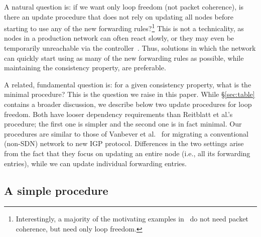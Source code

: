 A natural question is: if we want only loop freedom (not packet coherence), is there an update procedure that does not rely on updating all nodes before starting to use any of the new forwarding rules?\footnote{Interestingly, a majority of the motivating examples in~\cite{safeupdate} do not need packet coherence, but need only loop freedom.}  This is not a technicality, as nodes in a production network can often react slowly, or they may even be temporarily unreachable via the controller~\cite{b4}.  Thus, solutions in which the network can quickly start using as many of the new forwarding rules as possible, while maintaining the consistency property, are preferable.

A related, fundamental question is: for a given consistency property, what is the minimal procedure? This is the question we raise in this paper. While \S\ref{sec:table} contains a broader discussion, we describe below two update procedures for loop freedom. Both have looser dependency requirements than Reitblatt et al.'s procedure; the first one is simpler and the second one is in fact minimal. Our procedures are similar to those of Vanbever et al.~\cite{vanbever-ton} for migrating a conventional (non-SDN) network to new IGP protocol. Differences in the two settings arise from the fact that they focus on updating an entire node (i.e., all its forwarding entries), while we can update individual forwarding entries.




\subsection{A simple procedure}
\label{sec:practical}


